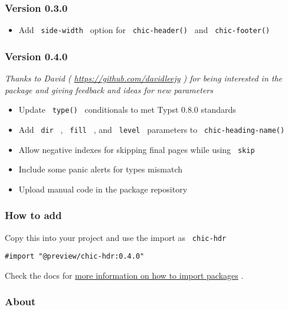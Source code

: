 \subsubsection{Version 0.3.0}\label{version-0.3.0}

\begin{itemize}
\tightlist
\item
  Add \texttt{\ side-width\ } option for \texttt{\ chic-header()\ } and
  \texttt{\ chic-footer()\ }
\end{itemize}

\subsubsection{Version 0.4.0}\label{version-0.4.0}

\emph{Thanks to David ( \url{https://github.com/davidleejy} ) for being
interested in the package and giving feedback and ideas for new
parameters}

\begin{itemize}
\tightlist
\item
  Update \texttt{\ type()\ } conditionals to met Typst 0.8.0 standards
\item
  Add \texttt{\ dir\ } , \texttt{\ fill\ } , and \texttt{\ level\ }
  parameters to \texttt{\ chic-heading-name()\ }
\item
  Allow negative indexes for skipping final pages while using
  \texttt{\ skip\ }
\item
  Include some panic alerts for types mismatch
\item
  Upload manual code in the package repository
\end{itemize}

\subsubsection{How to add}\label{how-to-add}

Copy this into your project and use the import as \texttt{\ chic-hdr\ }

\begin{verbatim}
#import "@preview/chic-hdr:0.4.0"
\end{verbatim}



Check the docs for
\href{https://typst.app/docs/reference/scripting/\#packages}{more
information on how to import packages} .

\subsubsection{About}\label{about}

